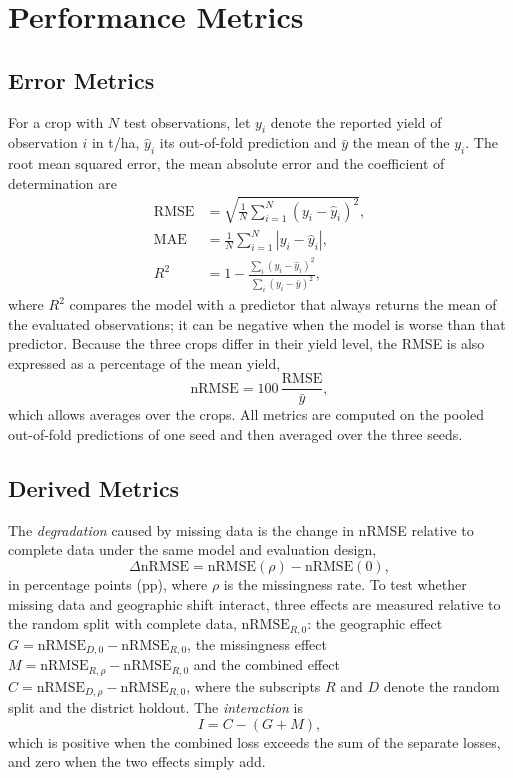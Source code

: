 \section{Performance Metrics}\label{sec:metrics}

\subsection{Error Metrics}

For a crop with $N$ test observations, let $y_i$ denote the reported yield of observation $i$ in
t/ha, $\hat{y}_i$ its out-of-fold prediction and $\bar{y}$ the mean of the $y_i$. The root mean
squared error, the mean absolute error and the coefficient of determination are
\begin{align}
\mathrm{RMSE} &= \sqrt{\frac{1}{N}\sum_{i=1}^{N}\left(y_i - \hat{y}_i\right)^2}, \label{eq:rmse}\\
\mathrm{MAE} &= \frac{1}{N}\sum_{i=1}^{N}\left|y_i - \hat{y}_i\right|, \label{eq:mae}\\
R^2 &= 1 - \frac{\sum_{i}\left(y_i - \hat{y}_i\right)^2}{\sum_{i}\left(y_i - \bar{y}\right)^2}, \label{eq:r2}
\end{align}
where $R^2$ compares the model with a predictor that always returns the mean of the evaluated
observations; it can be negative when the model is worse than that predictor. Because the three
crops differ in their yield level, the RMSE is also expressed as a percentage of the mean yield,
\begin{equation}
\mathrm{nRMSE} = 100\,\frac{\mathrm{RMSE}}{\bar{y}}, \label{eq:nrmse}
\end{equation}
which allows averages over the crops. All metrics are computed on the pooled out-of-fold
predictions of one seed and then averaged over the three seeds.

\subsection{Derived Metrics}

The \emph{degradation} caused by missing data is the change in nRMSE relative to complete data
under the same model and evaluation design,
\begin{equation}
\Delta\mathrm{nRMSE} = \mathrm{nRMSE}(\rho) - \mathrm{nRMSE}(0), \label{eq:delta}
\end{equation}
in percentage points (pp), where $\rho$ is the missingness rate. To test whether missing data and
geographic shift interact, three effects are measured relative to the random split with complete
data, $\mathrm{nRMSE}_{R,0}$: the geographic effect
$G = \mathrm{nRMSE}_{D,0} - \mathrm{nRMSE}_{R,0}$, the missingness effect
$M = \mathrm{nRMSE}_{R,\rho} - \mathrm{nRMSE}_{R,0}$ and the combined effect
$C = \mathrm{nRMSE}_{D,\rho} - \mathrm{nRMSE}_{R,0}$, where the subscripts $R$ and $D$ denote the
random split and the district holdout. The \emph{interaction} is
\begin{equation}
I = C - (G + M), \label{eq:inter}
\end{equation}
which is positive when the combined loss exceeds the sum of the separate losses, and zero when the
two effects simply add.

